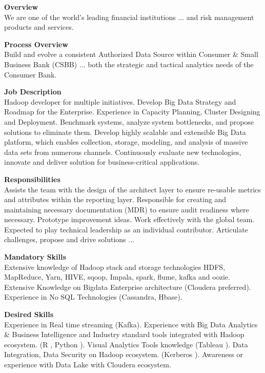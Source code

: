 \documentclass[12pt]{article}
\begin{document}
\begin{tcolorbox}[colback=boxbackground,colframe=boxframe,sharp corners]

\noindent \textbf{Overview}\\
We are one of the world’s leading financial institutions ... and risk management products and services.

\noindent \textbf{Process Overview}\\
Build and evolve a consistent Authorized Data Source within Consumer \& Small Business Bank (CSBB) ... both the strategic and tactical analytics needs of the Consumer Bank.

\noindent \textbf{Job Description}\\
Hadoop developer for multiple initiatives. Develop Big Data Strategy and Roadmap for the Enterprise. Experience in Capacity Planning, Cluster Designing and Deployment. Benchmark systems, analyze system bottlenecks, and propose solutions to eliminate them. Develop highly scalable and extensible Big Data platform, which enables collection, storage, modeling, and analysis of massive data sets from numerous channels. Continuously evaluate new technologies, innovate and deliver solution for business-critical applications.

\noindent \textbf{Responsibilities}\\
Assists the team with the design of the architect layer to ensure re-usable metrics and attributes within the reporting layer. Responsible for creating and maintaining necessary documentation (MDR) to ensure audit readiness where necessary. Prototype improvement ideas. Work effectively with the global team. Expected to play technical leadership as an individual contributor. Articulate challenges, propose and drive solutions ...

\noindent \textbf{Mandatory Skills}\\
Extensive knowledge of Hadoop stack and storage technologies HDFS, MapReduce, Yarn, HIVE, sqoop, Impala, spark, flume, kafka and oozie. Extensive Knowledge on Bigdata Enterprise architecture (Cloudera preferred). Experience in No SQL Technologies (Cassandra, Hbase).

\noindent \textbf{Desired Skills}\\
Experience in Real time streaming (Kafka). Experience with Big Data Analytics \& Business Intelligence and Industry standard tools integrated with Hadoop ecosystem. (R , Python ). Visual Analytics Tools knowledge (Tableau ). Data Integration, Data Security on Hadoop ecosystem. (Kerberos ). Awareness or experience with Data Lake with Cloudera ecosystem.
\end{tcolorbox} 

\end{document}
